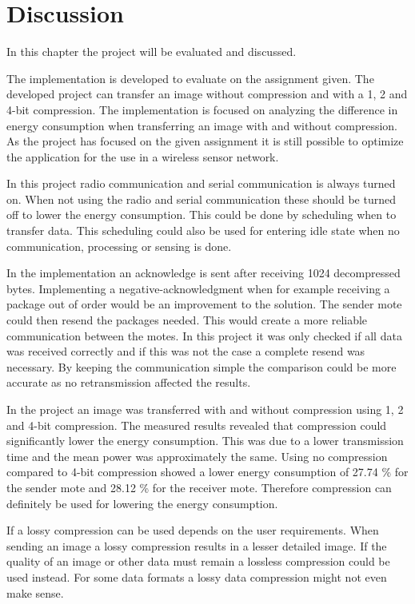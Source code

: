 \chapter{Discussion}
\label{chp:disc}

In this chapter the project will be evaluated and discussed.

The implementation is developed to evaluate on the assignment given. The developed project can transfer an image without compression and with a 1, 2 and 4-bit compression. The implementation is focused on analyzing the difference in energy consumption when transferring an image with and without compression. As the project has focused on the given assignment it is still possible to optimize the application for the use in a wireless sensor network.  

In this project radio communication and serial communication is always turned on. When not using the radio and serial communication these should be turned off to lower the energy consumption. This could be done by scheduling when to transfer data. This scheduling could also be used for entering idle state when no communication, processing or sensing is done.

In the implementation an acknowledge is sent after receiving 1024 decompressed bytes. Implementing a negative-acknowledgment when for example receiving a package out of order would be an improvement to the solution. The sender mote could then resend the packages needed. This would create a more reliable communication between the motes. In this project it was only checked if all data was received correctly and if this was not the case a complete resend was necessary. By keeping the communication simple the comparison could be more accurate as no retransmission affected the results.

In the project an image was transferred with and without compression using 1, 2 and 4-bit compression. The measured results revealed that compression could significantly lower the energy consumption. This was due to a lower transmission time and the mean power was approximately the same. Using no compression compared to 4-bit compression showed a lower energy consumption of 27.74 \% for the sender mote and 28.12 \% for the receiver mote. Therefore compression can definitely be used for lowering the energy consumption.

If a lossy compression can be used depends on the user requirements. When sending an image a lossy compression results in a lesser detailed image. If the quality of an image or other data must remain a lossless compression could be used instead. For some data formats a lossy data compression might not even make sense.

